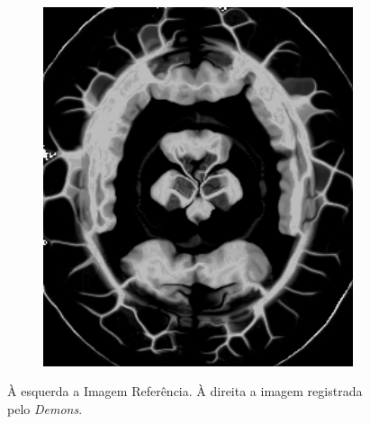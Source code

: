 \documentclass[t]{beamer}
\begin{document}
\begin{frame}
\begin{figure}[H]
\begin{subfigure}[b]{0.49\textwidth}
      \includegraphics[width=1\textwidth]{figuras/resultDistDemons.png}
    \end{subfigure}
    \caption{À esquerda a Imagem Referência. À direita a imagem registrada pelo \textit{Demons}.}
  \end{figure}
\end{frame}
\end{document}
